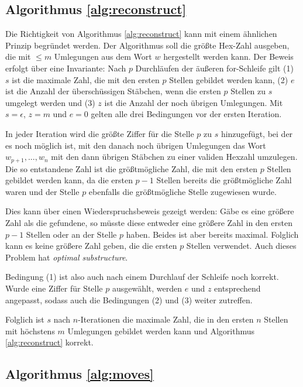 \documentclass[a4paper,10pt,ngerman]{scrartcl}
\begin{document}
\subsection{Algorithmus \ref*{alg:reconstruct}}
Die Richtigkeit von Algorithmus \ref{alg:reconstruct} kann mit einem ähnlichen Prinzip begründet werden. 
Der Algorithmus soll die größte Hex-Zahl ausgeben, die mit $\leq m$ Umlegungen aus dem Wort $w$ hergestellt werden kann.
Der Beweis erfolgt über eine Invariante: Nach $p$ Durchläufen der äußeren for-Schleife gilt (1) $s$ ist die maximale Zahl, die mit den ersten $p$ Stellen gebildet werden kann, (2) $e$ ist die Anzahl der überschüssigen Stäbchen, wenn die ersten $p$ Stellen zu $s$ umgelegt werden und (3) $z$ ist die Anzahl der noch übrigen Umlegungen.
Mit $s = \epsilon$, $z = m$ und $e = 0$ gelten alle drei Bedingungen vor der ersten Iteration.

In jeder Iteration wird die größte Ziffer für die Stelle $p$ zu $s$ hinzugefügt, bei der es noch möglich ist, mit den danach noch übrigen Umlegungen das Wort $w_{p+1}, ..., w_n$ mit den dann übrigen Stäbchen zu einer validen Hexzahl umzulegen. 
Die so entstandene Zahl ist die größtmögliche Zahl, die mit den ersten $p$ Stellen gebildet werden kann, da die ersten $p-1$ Stellen bereits die größtmögliche Zahl waren und der Stelle $p$ ebenfalls die größtmögliche Stelle zugewiesen wurde. 

Dies kann über einen Wiederspruchsbeweis gezeigt werden: Gäbe es eine größere Zahl als die gefundene, so müsste diese entweder eine größere Zahl in den ersten $p-1$ Stellen oder an der Stelle $p$ haben. Beides ist aber bereits maximal. Folglich kann es keine größere Zahl geben, die die ersten $p$ Stellen verwendet. Auch dieses Problem hat \textit{optimal substructure}.

Bedingung (1) ist also auch nach einem Durchlauf der Schleife noch korrekt. Wurde eine Ziffer für Stelle $p$ ausgewählt, werden $e$ und $z$ entsprechend angepasst, sodass auch die Bedingungen (2) und (3) weiter zutreffen. 

Folglich ist $s$ nach $n$-Iterationen die maximale Zahl, die in den ersten $n$ Stellen mit höchstens $m$ Umlegungen gebildet werden kann und Algorithmus \ref{alg:reconstruct} korrekt.

\subsection{Algorithmus \ref*{alg:moves}}
\end{document}
